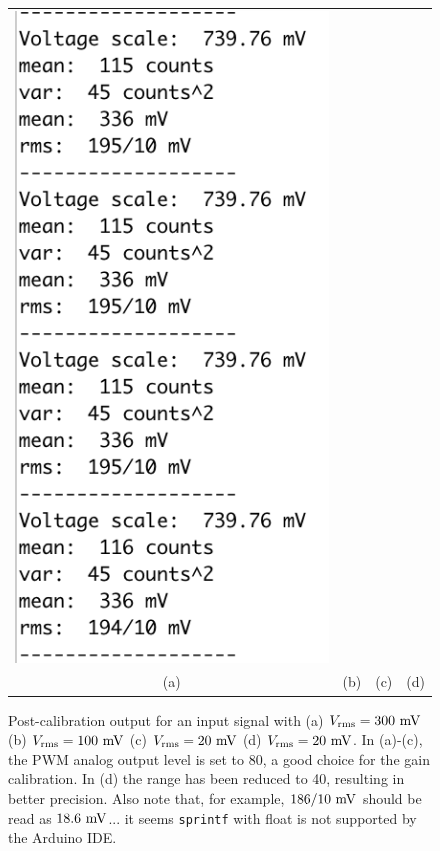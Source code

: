 \documentclass[12pt]{article}
\begin{document}
\begin{figure}[htbp]
\begin{center}
\begin{tabular}{cccc}
{\includegraphics[height=0.30\textheight]{figs/calibd.png}} \\
(a) & (b) & (c) & (d) \\
\end{tabular}
\end{center}
\caption{\label{fig:calib}   Post-calibration output for an input signal with (a) $V_{\rm rms}=300~\rm mV$ (b) $V_{\rm rms}=100~\rm mV$ (c) $V_{\rm rms}=20~\rm mV$ (d) $V_{\rm rms}=20~\rm mV$.  In (a)-(c), the PWM analog output level is set to 80, a good choice for the gain calibration.  In (d) the range has been reduced to 40, resulting in better precision.  Also note that, for example, $186/10~\rm mV$ should be read as $18.6~\rm mV$... it seems {\tt sprintf} with float is not supported by the Arduino IDE.}
\end{figure}
\end{document}
